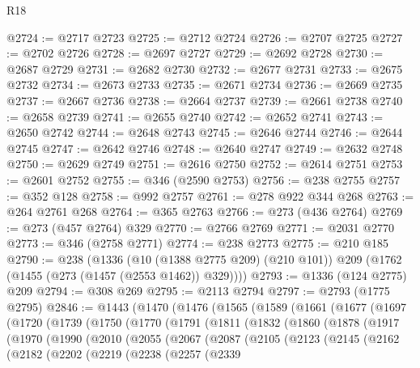 \begin{lexlean}{R18}
\begin{coremodule}
{{{{{{{{{{{{{{{{{{{@2724 := @2717 @2723
@2725 := @2712 @2724
@2726 := @2707 @2725
@2727 := @2702 @2726
@2728 := @2697 @2727
@2729 := @2692 @2728
@2730 := @2687 @2729
@2731 := @2682 @2730
@2732 := @2677 @2731
@2733 := @2675 @2732
@2734 := @2673 @2733
@2735 := @2671 @2734
@2736 := @2669 @2735
@2737 := @2667 @2736
@2738 := @2664 @2737
@2739 := @2661 @2738
@2740 := @2658 @2739
@2741 := @2655 @2740
@2742 := @2652 @2741
@2743 := @2650 @2742
@2744 := @2648 @2743
@2745 := @2646 @2744
@2746 := @2644 @2745
@2747 := @2642 @2746
@2748 := @2640 @2747
@2749 := @2632 @2748
@2750 := @2629 @2749
@2751 := @2616 @2750
@2752 := @2614 @2751
@2753 := @2601 @2752
@2755 := @346 (@2590 @2753)
@2756 := @238 @2755
@2757 := @352 @128
@2758 := @992 @2757
@2761 := @278 @922 @344 @268
@2763 := @264 @2761 @268
@2764 := @365 @2763
@2766 := @273 (@436 @2764)
@2769 := @273 (@457 @2764) @329
@2770 := @2766 @2769
@2771 := @2031 @2770
@2773 := @346 (@2758 @2771)
@2774 := @238 @2773
@2775 := @210 @185
@2790 := @238
    (@1336
      (@10 (@1388 @2775 @209) (@210 @101))
      @209
      (@1762 (@1455 (@273 (@1457 (@2553 @1462)) @329))))
@2793 := @1336 (@124 @2775) @209
@2794 := @308 @269
@2795 := @2113 @2794
@2797 := @2793 (@1775 @2795)
@2846 := @1443
    (@1470
      (@1476
        (@1565
          (@1589
            (@1661
              (@1677
                (@1697
                  (@1720
                    (@1739
                      (@1750
                        (@1770
                          (@1791
                            (@1811
                              (@1832
                                (@1860
                                  (@1878
                                    (@1917
                                      (@1970
                                        (@1990
                                          (@2010
                                            (@2055
                                              (@2067
                                                (@2087
                                                  (@2105
                                                    (@2123
                                                      (@2145
                                                        (@2162
                                                          (@2182
                                                            (@2202
                                                              (@2219
                                                                (@2238
                                                                  (@2257
                                                                    (@2339
}}}}}}}}}}}}}}}}}}}
\end{coremodule}
\end{lexlean}
